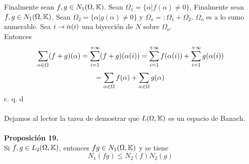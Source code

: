 Finalmente sean $f,g \in N_1 (\Omega , \mathbb{K})$. Sean $\Omega_1 = \lbrace \alpha | f(\alpha) \neq 0 \rbrace$, 
Finalmente sean $f,g \in N_1 (\Omega , \mathbb{K})$. Sean $\Omega_2 = \lbrace \alpha | g(\alpha) \neq 0 \rbrace$ y $\Omega_o =: \Omega_1 + \Omega_2$. $\Omega_o$ es a lo sumo numerable. Sea $i \rightarrow \alpha (i)$ una biyección de $N$ sobre $\Omega_o$. \\
Entonces \\
\begin{equation*}
\sum_{\alpha \in \Omega}(f+g)(\alpha)=\sum_{i=1}^{+\infty} (f+g) (\alpha (i))= \sum_{i=1}^{+\infty} f(\alpha (i))+ \sum_{i=1}^{+\infty}  g(\alpha (i))
\end{equation*}
$$
=\sum_{\alpha \in \Omega}f(\alpha) + \sum_{\alpha \in \Omega}g(\alpha)
$$
\phantom{sssssssssssssssssssssssssssssssssss sasdasdasdasdadadssada} c. q. d \\ \\
Dejamos al lector la tarea de demostrar que $L (\Omega ,\mathbb{K})$ es un espacio de Banach. \\ \\
\textbf{Proposición 19.} \\
Si $f,g \in L_2 (\Omega,\mathbb{K})$, entonces $fg \in N_1 (\Omega ,\mathbb{K})$ y se tiene 
\begin{equation*}
\boxed{N_1 (fg) \leq N_2 (f) N_2(g)}
\end{equation*}

